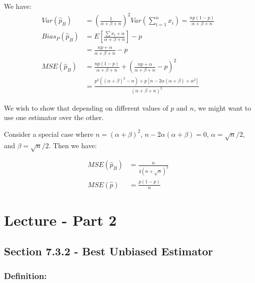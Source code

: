 \documentclass{article}
\begin{document}
\begin{enumerate}
    We have:
    \begin{equation*}
        \begin{split}
            Var\left(\hat{p}_B \right) &= \left(\frac{1}{\alpha + \beta + n} \right)^2 Var\left(\sum_{i=1}^n x_i \right) = \frac{np(1-p)}{\alpha + \beta + n}\\
            Bias_P(\hat{p}_B) &= E\left[\frac{\sum x_i + \alpha}{\alpha + \beta + n} \right] - p\\
            &= \frac{np + \alpha}{\alpha + \beta + n} - p\\
            MSE(\hat{p}_B) &= \frac{np(1-p)}{\alpha + \beta + n} + \left( \frac{np + \alpha}{\alpha + \beta + n} - p \right)^2\\
            &= \frac{p^2((\alpha+\beta)^2 -n) + p[n-2\alpha(\alpha+\beta)+\alpha^2]}{(\alpha + \beta + n)^2}
        \end{split}
    \end{equation*}


    We wish to show that depending on different values of $p$ and $n$, we might want to use one estimator over the other.

    Consider a special case where $n = (\alpha + \beta)^2$, $n-2\alpha(\alpha + \beta) = 0$, $\alpha = \sqrt{n}/2$, and $\beta = \sqrt{n}/2$. Then we have:

    \begin{equation*}
        \begin{split}
            MSE(\hat{p}_B) &= \frac{n}{4(n+\sqrt{n})^2}\\
            MSE(\hat{p}) &= \frac{p(1-p)}{n}
        \end{split}
    \end{equation*}

\end{enumerate}


\section{Lecture - Part 2}

\subsection{Section 7.3.2 - Best Unbiased Estimator}

\subsubsection*{Definition:}
\end{document}
